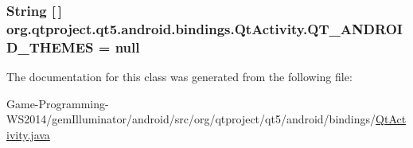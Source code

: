 \subsubsection[{Q\+T\+\_\+\+A\+N\+D\+R\+O\+I\+D\+\_\+\+T\+H\+E\+M\+E\+S}]{\setlength{\rightskip}{0pt plus 5cm}String \mbox{[}$\,$\mbox{]} org.\+qtproject.\+qt5.\+android.\+bindings.\+Qt\+Activity.\+Q\+T\+\_\+\+A\+N\+D\+R\+O\+I\+D\+\_\+\+T\+H\+E\+M\+E\+S = null}\label{classorg_1_1qtproject_1_1qt5_1_1android_1_1bindings_1_1_qt_activity_a0abec2a740bce96eec092bd1634d3a55}


The documentation for this class was generated from the following file\+:\begin{DoxyCompactItemize}
\item 
Game-\/\+Programming-\/\+W\+S2014/gem\+Illuminator/android/src/org/qtproject/qt5/android/bindings/\hyperlink{_qt_activity_8java}{Qt\+Activity.\+java}\end{DoxyCompactItemize}
